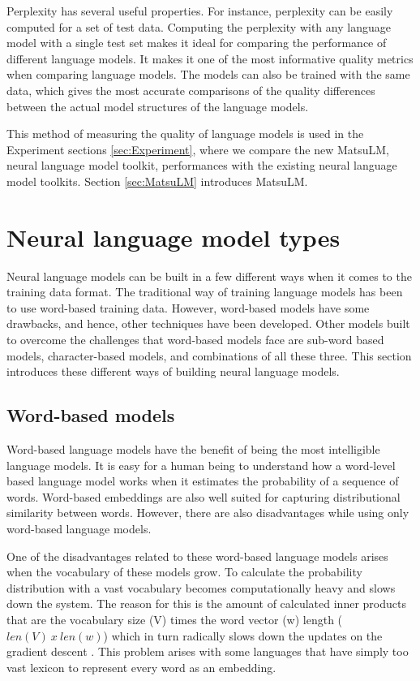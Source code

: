 Perplexity has several useful properties. For instance, perplexity can be easily computed for a set of test data. Computing the perplexity with any language model with a single test set makes it ideal for comparing the performance of different language models. It makes it one of the most informative quality metrics when comparing language models. The models can also be trained with the same data, which gives the most accurate comparisons of the quality differences between the actual model structures of the language models. \parencite{jurafsky2014speech,goodman2001bit,mikolov2012statistical}

This method of measuring the quality of language models is used in the Experiment sections \ref{sec:Experiment}, where we compare the new MatsuLM, neural language model toolkit, performances with the existing neural language model toolkits. Section \ref{sec:MatsuLM} introduces MatsuLM.


\section{Neural language model types}

Neural language models can be built in a few different ways when it comes to the training data format. The traditional way of training language models has been to use word-based training data. However, word-based models have some drawbacks, and hence, other techniques have been developed. Other models built to overcome the challenges that word-based models face are sub-word based models, character-based models, and combinations of all these three. This section introduces these different ways of building neural language models.

\subsection{Word-based models}

Word-based language models have the benefit of being the most intelligible language models. It is easy for a human being to understand how a word-level based language model works when it estimates the probability of a sequence of words. Word-based embeddings are also well suited for capturing distributional similarity between words. However, there are also disadvantages while using only word-based language models. \parencite{jurafsky2014speech}

One of the disadvantages related to these word-based language models arises when the vocabulary of these models grow. To calculate the probability distribution with a vast vocabulary becomes computationally heavy and slows down the system. The reason for this is the amount of calculated inner products that are the vocabulary size (V) times the word vector (w) length ($len(V)\ x\ len(w)$) which in turn radically slows down the updates on the gradient descent \parencite{morin2005hierarchical}. This problem arises with some languages that have simply too vast lexicon to represent every word as an embedding.

